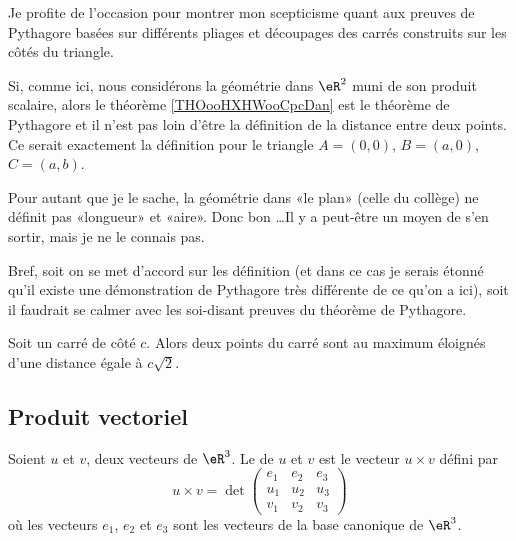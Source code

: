 \begin{normaltext}
	Je profite de l'occasion pour montrer mon scepticisme quant aux preuves de Pythagore basées sur différents pliages et découpages des carrés construits sur les côtés du triangle.

	Si, comme ici, nous considérons la géométrie dans \( \eR^2\) muni de son produit scalaire, alors le théorème \ref{THOooHXHWooCpcDan} est le théorème de Pythagore et il n'est pas loin d'être la définition de la distance entre deux points. Ce serait exactement la définition pour le triangle \( A=(0,0)\), \( B=(a,0)\), \( C=(a,b)\).

	Pour autant que je le sache, la géométrie dans «le plan» (celle du collège) ne définit pas «longueur» et «aire». Donc bon \ldots Il y a peut-être un moyen de s'en sortir, mais je ne le connais pas.

	Bref, soit on se met d'accord sur les définition (et dans ce cas je serais étonné qu'il existe une démonstration de Pythagore très différente de ce qu'on a ici), soit il faudrait se calmer avec les soi-disant preuves du théorème de Pythagore.
\end{normaltext}

\begin{lemma}       \label{LEMooKDGRooMmJqnn}
	Soit un carré de côté \( c\). Alors deux points du carré sont au maximum éloignés d'une distance égale à \( c\sqrt{ 2 }\).
\end{lemma}


\subsection{Produit vectoriel}

\begin{definition}      \label{DEFooTNTNooRjhuJZ}
	Soient \( u\) et \( v\), deux vecteurs de \( \eR^3\). Le  de \( u\) et \( v\) est le vecteur \( u\times v\) défini par
	\begin{equation}    \label{EQooCUJRooFuFPaZ}
		u\times v=\det\begin{pmatrix}
			e_1 & e_2 & e_3 \\
			u_1 & u_2 & u_3 \\
			v_1 & v_2 & v_3
		\end{pmatrix}
	\end{equation}
	où les vecteurs \( e_1\), \( e_2\) et \( e_3\) sont les vecteurs de la base canonique de \( \eR^3\).
\end{definition}

